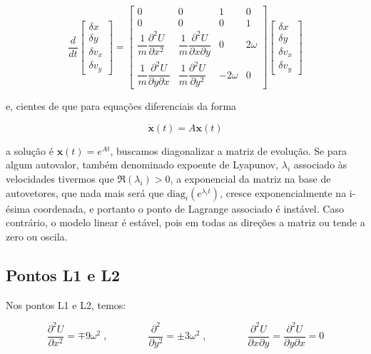 \begin{equation}
\frac{d}{dt}
  \begin{bmatrix}
    \delta x \\
    \delta y \\
    \delta v_x \\
    \delta v_y
 \end{bmatrix}
=
 \begin{bmatrix}
   0 & 0 & 1 & 0 \\
   0 & 0 & 0 & 1 \\
   \dfrac{1}{m} \dfrac{\partial ^2U}{\partial x^2} & \dfrac{1}{m} \dfrac{\partial ^2U}{\partial x\partial y} & 0 & 2\omega \\
   \dfrac{1}{m} \dfrac{\partial ^2U}{\partial y \partial x} & \dfrac{1}{m} \dfrac{\partial ^2U}{\partial y^2} & -2\omega & 0
 \end{bmatrix}
   \begin{bmatrix}
    \delta x \\
    \delta y \\
    \delta v_x \\
    \delta v_y
 \end{bmatrix}
\end{equation}

e, cientes de que para equações diferenciais da forma

\begin{equation}
    \dot{\mathbf{x}}(t) = A\mathbf{x}(t)
\end{equation}

a solução é $\mathbf{x}(t) = e^{At}$, buscamos diagonalizar a matriz de evolução. Se para algum autovalor, também denominado expoente de Lyapunov, $\lambda_i$ associado às velocidades tivermos que $\Re(\lambda_i) > 0$, a exponencial da matriz na base de autovetores, que nada mais será que $\text{diag}_i(e^{\lambda_i t})$, cresce exponencialmente na i-ésima coordenada, e portanto o ponto de Lagrange associado é instável. Caso contrário, o modelo linear é estável, pois em todas as direções a matriz ou tende a zero ou oscila.

\subsection{Pontos L1 e L2}

Nos pontos L1 e L2, temos:

\begin{equation}
\dfrac{\partial ^2U}{\partial x^2} = \mp 9\omega^2 \;, \qquad \qquad \dfrac{\partial ^2}{\partial y^2} = \pm 3\omega^2 \;, \qquad \qquad \dfrac{\partial ^2U}{\partial x\partial y} = \dfrac{\partial ^2U}{\partial y\partial x} = 0
\end{equation}

